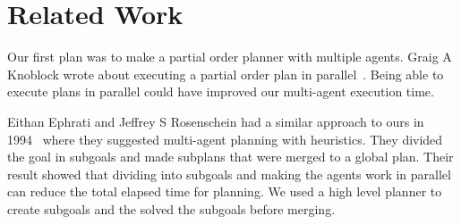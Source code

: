 \section{Related Work}
\label{sec:related work}
Our first plan was to make a partial order planner with multiple agents.
Graig A Knoblock wrote about executing a partial order plan in parallel~\cite{knoblock1994generating}.
Being able to execute plans in parallel could have improved our multi-agent execution time.

Eithan Ephrati and Jeffrey S Rosenschein had a similar approach to ours in 1994~\cite{ephrati1994divide} where they suggested multi-agent planning with heuristics.
They divided the goal in subgoals and made subplans that were merged to a global plan.
Their result showed that dividing into subgoals and making the agents work in parallel can reduce the total elapsed time for planning.
We used a high level planner to create subgoals and the solved the subgoals before merging.




